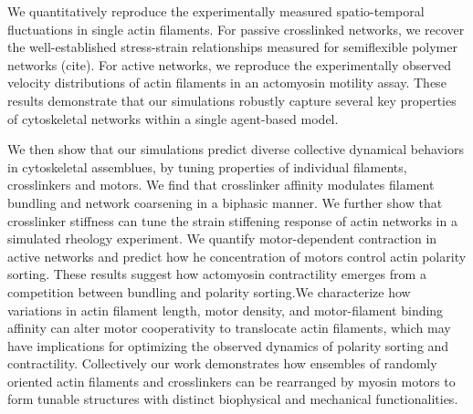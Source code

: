 \documentclass[11pt]{article}
\begin{document}
We {\color{red}quantitatively} reproduce {\color{red}the experimentally measured} spatio-temporal fluctuations {\color{red}in single} actin filaments. 
For passive crosslinked networks, we {\color{red}recover the well-established} stress-strain relationships {\color{red}measured} for {\color{red}semiflexible polymer} networks {\color{red}(cite)}. For active networks, we reproduce {\color{red}the experimentally observed} velocity distributions of actin filaments in an {\color{red}actomyosin} motility assay. These results demonstrate that {\color{red}our simulations robustly} capture {\color{red}several} key properties of cytoskeletal networks within a single {\color{red}agent-based} model. 
\par 
We then show that {\color{red}our} simulations predict {\color{red}diverse collective} dynamical behaviors {\color{red}in cytoskeletal assemblues}, {\color{red}by tuning} properties of {\color{red}individual} filaments, crosslinkers and motors. We find that crosslinker affinity modulates filament bundling and network coarsening in a {\color{red}biphasic} manner. We {\color{red}further} show that crosslinker stiffness {\color{red}can tune} the strain stiffening response of {\color{red}actin} networks in a simulated rheology experiment. We {\color{red}quantify} motor-dependent contraction {\color{red}in active networks} {\color{red}and predict how} he concentration of motors control {\color{red}actin} polarity sorting. These results {\color{red}suggest how actomyosin} contractility {\color{red}emerges from} a competition between bundling and polarity sorting.We {\color{red}characterize} how variations in {\color{red}actin} filament length, motor density, and motor-filament binding affinity can {\color{red}alter motor cooperativity} to translocate actin filaments, which may have implications for optimizing the {\color{red}observed dynamics of} polarity sorting and contractility. {\color{red}Collectively our work} demonstrates how ensembles of randomly oriented actin filaments and crosslinkers can be rearranged by myosin motors to form tunable structures with distinct biophysical and mechanical functionalities.

\end{document}
